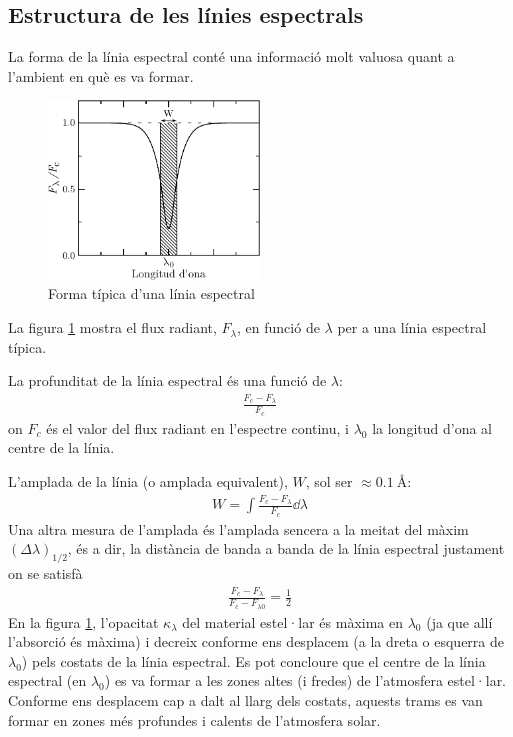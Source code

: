 \subsection{Estructura de les línies espectrals}
La forma de la línia espectral conté una informació molt valuosa quant a l'ambient en què es va formar.
\begin{figure}[h]
	\centering
	\includegraphics[width=0.5\textwidth]{./images/4-typical-spectral}
	\caption{Forma típica d'una línia espectral}
	\label{fig:typical-spectral}
\end{figure}

La figura \ref{fig:typical-spectral} mostra el flux radiant, $F_{\lambda}$, en funció de $\lambda$ per a una línia espectral típica.

La profunditat de la línia espectral és una funció de $\lambda$:
\begin{align}
	\frac{F_{c} - F_{\lambda}}{F_{c}}
\end{align}
on $F_{c}$ és el valor del flux radiant en l'espectre continu, i $\lambda_{0}$ la longitud d'ona al centre de la línia.

L'amplada de la línia (o amplada equivalent), $W$, sol ser $\approx \SI{0.1}{\angstrom}$:
\begin{align}
	W = \int \frac{F_{c} - F_{\lambda}}{F_{c}} \dd{\lambda}
\end{align}
Una altra mesura de l'amplada és l'amplada sencera a la meitat del màxim $(\Delta \lambda)_{1/2}$, és a dir, la distància de banda a banda de la línia espectral justament on se satisfà
\begin{align*}
	\frac{F_{c} - F_{\lambda}}{F_{c} - F_{\lambda 0}} = \frac{1}{2}
\end{align*}
En la figura \ref{fig:typical-spectral}, l'opacitat $\kappa_{\lambda}$ del material estel·lar és màxima en $\lambda_{0}$ (ja que allí l'absorció és màxima) i decreix conforme ens desplacem (a la dreta o esquerra de $\lambda_{0}$) pels costats de la línia espectral. Es pot concloure que el centre de la línia espectral (en $\lambda_{0}$) es va formar a les zones altes (i fredes) de l'atmosfera estel·lar. Conforme ens desplacem cap a dalt al llarg dels costats, aquests trams es van formar en zones més profundes i calents de l'atmosfera solar.

